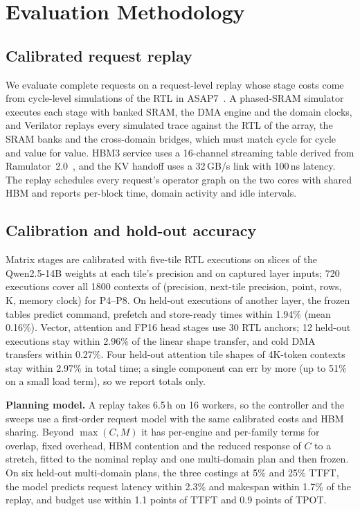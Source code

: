 \section{Evaluation Methodology}
\label{sec:method}

\subsection{Calibrated request replay}
We evaluate complete requests on a request-level replay whose stage costs come from cycle-level simulations of the RTL in ASAP7~\cite{asap7}.
A phased-SRAM simulator executes each stage with banked SRAM, the DMA engine and the domain clocks, and Verilator replays every simulated trace against the RTL of the array, the SRAM banks and the cross-domain bridges, which must match cycle for cycle and value for value.
HBM3 service uses a 16-channel streaming table derived from Ramulator~2.0~\cite{luo2023ramulator2}, and the KV handoff uses a 32\,GB/s link with 100\,ns latency.
The replay schedules every request's operator graph on the two cores with shared HBM and reports per-block time, domain activity and idle intervals.

\subsection{Calibration and hold-out accuracy}
Matrix stages are calibrated with five-tile RTL executions on slices of the Qwen2.5-14B weights at each tile's precision and on captured layer inputs; 720 executions cover all 1800 contexts of (precision, next-tile precision, point, rows, K, memory clock) for P4--P8. On held-out executions of another layer, the frozen tables predict command, prefetch and store-ready times within 1.94\% (mean 0.16\%).
Vector, attention and FP16 head stages use 30 RTL anchors; 12 held-out executions stay within 2.96\% of the linear shape transfer, and cold DMA transfers within 0.27\%. Four held-out attention tile shapes of 4K-token contexts stay within 2.97\% in total time; a single component can err by more (up to 51\% on a small load term), so we report totals only.

\textbf{Planning model.} A replay takes 6.5\,h on 16 workers, so the controller and the sweeps use a first-order request model with the same calibrated costs and HBM sharing. Beyond $\max(C,M)$ it has per-engine and per-family terms for overlap, fixed overhead, HBM contention and the reduced response of $C$ to a stretch, fitted to the nominal replay and one multi-domain plan and then frozen. On six held-out multi-domain plans, the three costings at 5\% and 25\% TTFT, the model predicts request latency within 2.3\% and makespan within 1.7\% of the replay, and budget use within 1.1 points of TTFT and 0.9 points of TPOT.

